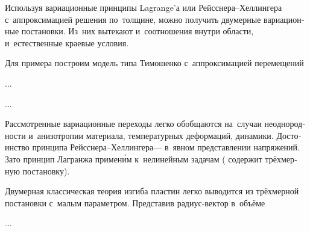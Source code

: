 
\begin{otherlanguage}{russian}

Используя вариационные принципы Lagrange’а или Рейсснера--Хеллингера с~аппроксимацией решения по~толщине, можно получить двумерные вариационные постановки.
Из~них вытекают и~соотношения внутри области, и~естественные краевые условия.

Для примера построим модель типа Тимошенко с~аппроксимацией перемещений

...


...

Рассмотренные вариационные переходы легко обобщаются на~случаи неоднородности и~анизотропии материала, температурных деформаций, динамики.
Достоинство принципа Рейсснера--Хеллингера\:--- в~явном представлении напряжений.
\hbox{Зато} принцип Лагранжа примен\'{и}м к~нелинейным задачам ( содержит трёхмерную постановку).

\end{otherlanguage}



\begin{otherlanguage}{russian}

Двумерная классическая теория изгиба пластин легко выводится из трёхмерной постановки с~малым параметром.
Представив радиус\hbox{-}вектор в~объёме

...



\end{otherlanguage}


